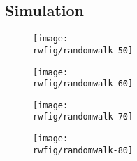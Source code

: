 \documentclass[12pt,a4paper]{article}
\newcommand{\rwfig}{../fig/random-walk}
\begin{document}
	\subsection{Simulation}
	\begin{figure}
		\centering
		\texttt{[image: \\rwfig/randomwalk-50]}
	\end{figure}
	\begin{figure}
		\centering
		\texttt{[image: \\rwfig/randomwalk-60]}
	\end{figure}
	\begin{figure}
		\centering
		\texttt{[image: \\rwfig/randomwalk-70]}
	\end{figure}
	\begin{figure}
		\centering
		\texttt{[image: \\rwfig/randomwalk-80]}
	\end{figure}
\end{document}
